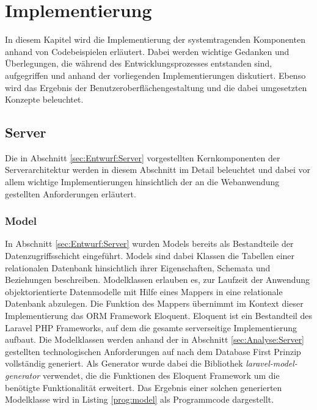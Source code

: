 \chapter{Implementierung}
\label{cha:Implementierung}

In diesem Kapitel wird die Implementierung der systemtragenden Komponenten anhand von Codebeispielen erläutert. Dabei werden wichtige Gedanken und Überlegungen, die während des Entwicklungsprozesses entstanden sind, aufgegriffen und anhand der vorliegenden Implementierungen diskutiert. Ebenso wird das Ergebnis der Benutzeroberflächengestaltung und die dabei umgesetzten Konzepte beleuchtet.

\section{Server}

Die in Abschnitt \ref{sec:Entwurf:Server} vorgestellten Kernkomponenten der Serverarchitektur werden in diesem Abschnitt im Detail beleuchtet und dabei vor allem wichtige Implementierungen hinsichtlich der an die Webanwendung gestellten Anforderungen erläutert.

\subsection{Model}

In Abschnitt \ref{sec:Entwurf:Server} wurden Models bereits als Bestandteile der Datenzugriffsschicht eingeführt. Models sind dabei Klassen die Tabellen einer relationalen Datenbank hinsichtlich ihrer Eigenschaften, Schemata und Beziehungen beschreiben. Modelklassen erlauben es, zur Laufzeit der Anwendung objektorientierte Datenmodelle mit Hilfe eines Mappers in eine relationale Datenbank abzulegen. Die Funktion des Mappers übernimmt im Kontext dieser Implementierung das \acf{ORM} Framework Eloquent. Eloquent ist ein Bestandteil des Laravel PHP Frameworks, auf dem die gesamte serverseitige Implementierung aufbaut. Die Modelklassen werden anhand der in Abschnitt \ref{sec:Analyse:Server} gestellten technologischen Anforderungen auf nach dem Database First Prinzip vollständig generiert. Als Generator wurde dabei die Bibliothek \emph{laravel-model-generator} verwendet, die die Funktionen des Eloquent Framework um die benötigte Funktionalität erweitert. Das Ergebnis einer solchen generierten Modelklasse wird in Listing \ref{prog:model} als Programmcode dargestellt.

